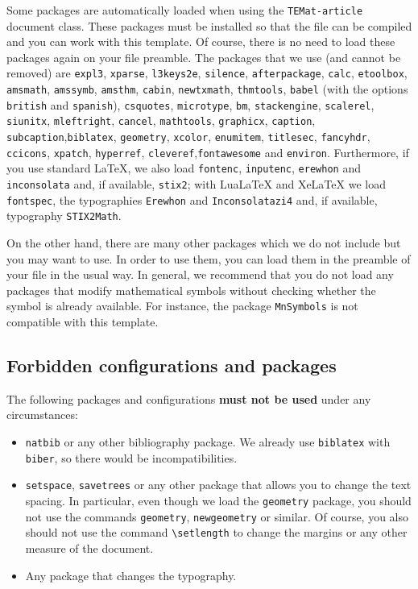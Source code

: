 \documentclass[babel-main=english]{TEMat-article}
\begin{document}
Some packages are automatically loaded when using the \verb+TEMat-article+ document class.
These packages must be installed so that the file can be compiled and you can work with this template.
Of course, there is no need to load these packages again on your file preamble.
The packages that we use (and cannot be removed) are \verb+expl3+, \verb+xparse+, \verb+l3keys2e+, \verb+silence+, \verb+afterpackage+, \verb+calc+, \verb+etoolbox+, \verb+amsmath+, \verb+amssymb+, \verb+amsthm+, \verb+cabin+, \verb+newtxmath+,  \verb+thmtools+, \verb+babel+ (with the options \verb+british+ and \verb+spanish+), \verb+csquotes+, \verb+microtype+, \verb+bm+, \verb+stackengine+, \verb+scalerel+, \verb+siunitx+, \verb+mleftright+, \verb+cancel+, \verb+mathtools+, \verb+graphicx+, \verb+caption+, \verb+subcaption+,\linebreak \verb+biblatex+, \verb+geometry+, \verb+xcolor+, \verb+enumitem+, \verb+titlesec+, \verb+fancyhdr+, \verb+ccicons+, \verb+xpatch+, \verb+hyperref+, \verb+cleveref+,\linebreak \verb+fontawesome+ and \verb+environ+.
Furthermore, if you use standard \LaTeX{}, we also load \verb+fontenc+, \verb+inputenc+, \verb+erewhon+ and \verb+inconsolata+ and, if available, \verb+stix2+; with LuaLaTeX and XeLaTeX we load \verb+fontspec+, the typographies \verb+Erewhon+ and \verb+Inconsolatazi4+  and, if available, typography \verb+STIX2Math+.

On the other hand, there are many other packages which we do not include but you may want to use.
In order to use them, you can load them in the preamble of your file in the usual way.
In general, we recommend that you do not load any packages that modify mathematical symbols without checking whether the symbol is already available.
For instance, the package \verb+MnSymbols+ is not compatible with this template.


\subsection{Forbidden configurations and packages}
The following packages and configurations \textbf{must not be used} under any circumstances:
\begin{itemize}
\item \verb+natbib+ or any other bibliography package.
  We already use \verb+biblatex+ with \verb+biber+, so there would be incompatibilities.
\item \verb+setspace+, \verb+savetrees+ or any other package that allows you to change the text spacing.
  In particular, even though we load the \verb+geometry+ package, you should not use the commands \verb+geometry+, \verb+newgeometry+ or similar.
  Of course, you also should not use the command \verb+\setlength+ to change the margins or any other measure of the document.
\item Any package that changes the typography.
\end{itemize}
\end{document}
